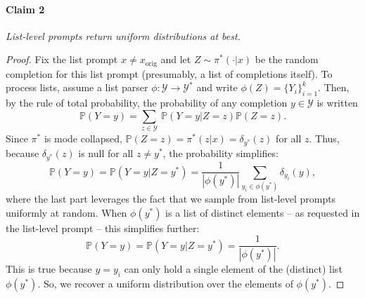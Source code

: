 \paragraph{Claim 2} \textit{List-level prompts return uniform distributions at best.}
\begin{proof}
Fix the list prompt $x \neq x_\text{orig}$ and let $Z \sim \pi^*(\cdot | x)$ be the random completion for this list prompt (presumably, a list of completions itself). To process lists, assume a list parser $\phi : \mathcal{Y} \to \mathcal{Y}^*$ and write $\phi(Z) = \{Y_i\}_{i=1}^k$. Then, by the rule of total probability, the probability of any completion $y \in \mathcal{Y}$ is written
\begin{equation}
    \mathbb{P}(Y = y) = \sum_{z \in \mathcal{Y}} \ \mathbb{P}(Y = y | Z = z)\mathbb{P}(Z = z).
\end{equation}
Since $\pi^*$ is mode collapsed, $\mathbb{P}(Z = z) = \pi^*(z | x) = \delta_{y^*}(z)$ for all $z$. Thus, because $\delta_{y^*}(z)$ is null for all $z \neq y^*$, the probability simplifies:
\begin{equation}
    \mathbb{P}(Y = y) = \mathbb{P}(Y = y | Z = y^*) = \frac{1}{|\phi(y^*)|} \sum_{y_i \in \phi(y^*)}  \delta_{y_i}(y),
\end{equation}
where the last part leverages the fact that we sample from list-level prompts uniformly at random. When $\phi(y^*)$ is a list of distinct elements -- as requested in the list-level prompt -- this simplifies further:
\begin{equation}
    \mathbb{P}(Y = y) = \mathbb{P}(Y = y | Z = y^*) = \frac{1}{|\phi(y^*)|}.
\end{equation}
This is true because $y = y_i$ can only hold a single element of the (distinct) list $\phi(y^*)$. So, we recover a uniform distribution over the elements of $\phi(y^*)$.
\end{proof}

